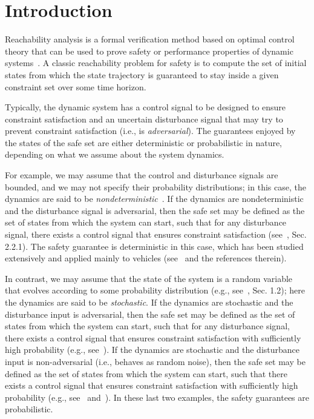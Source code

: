 \documentclass[letterpaper, 10 pt, conference]{ieeeconf}  %
\begin{document}
\section{Introduction}
Reachability analysis is a formal verification method based on optimal control theory that can be used to prove 
safety or performance properties of dynamic systems~\cite{bansal2017hamilton}.
A classic reachability problem for safety is to compute the set of initial states from which 
the state trajectory is guaranteed to stay inside a given constraint set over some time horizon.
 
 
 
Typically, the dynamic system has a control signal to be designed to ensure constraint satisfaction 
and an uncertain disturbance signal that may try to prevent constraint satisfaction (i.e., is \textit{adversarial}). 
The guarantees enjoyed by the states of the safe set are either deterministic or probabilistic in nature, 
depending on what we assume about the system dynamics.

For example, we may assume that the control and disturbance signals are bounded, 
and we may not specify their probability distributions; in this case,
the dynamics are said to be \textit{nondeterministic}~\cite{mitchell2005toolbox}.
If the dynamics are nondeterministic and the disturbance signal is adversarial, then the safe set may be defined as the set of states from which the system can 
start, such that for any disturbance signal,
there exists a control signal that ensures constraint satisfaction (see~\cite{EECS-2018-41}, Sec. 2.2.1).
The safety guarantee is deterministic in this case, which has been studied extensively and applied mainly to vehicles (see~\cite{bansal2017hamilton} and the references therein). 

In contrast, we may assume that the state of the system is a random variable that evolves according to some probability distribution 
(e.g., see~\cite{bertsekas2005dynamic}, Sec. 1.2); here the dynamics are said to be \textit{stochastic}.
If the dynamics are stochastic and the disturbance input is adversarial, 
then the safe set may be defined as the set of states from which the system can start, such that for any disturbance signal,
there exists a control signal that ensures constraint satisfaction with sufficiently high probability (e.g., see~\cite{kamgarpour2011discrete}).
If the dynamics are stochastic and the disturbance input is non-adversarial (i.e., behaves as random noise),
then the safe set may be defined as the set of states from which the system can start, such that there exists a control signal 
that ensures constraint satisfaction with sufficiently high probability (e.g., see~\cite{summers2010verification} and~\cite{abate2008probabilistic}).
In these last two examples, the safety guarantees are probabilistic.
\end{document}
